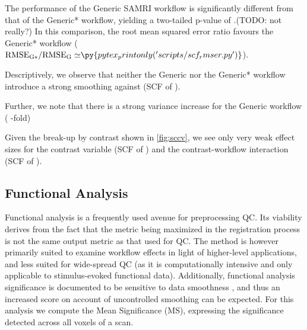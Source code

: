The performance of the Generic SAMRI workflow is significantly different from that of the Generic* workflow, yielding a two-tailed p-value of .(TODO: not really?)
In this comparison, the root mean squared error ratio favours the Generic* workflow ($\mathrm{RMSE_{G*}/RMSE_{G}\simeq} \py{pytex_printonly('scripts/scf_rmser.py')}$).

Descriptively, we observe that neither the Generic nor the Generic* workflow introduce a strong smoothing
against
(SCF of ).

Further, we note that there is a strong variance increase for the Generic workflow
(
-fold)

Given the break-up by contrast shown in \cref{fig:sccv}, we see only very weak effect sizes for the contrast variable
(SCF of )
and the contrast-workflow interaction
(SCF of ).

\subsection{Functional Analysis}

Functional analysis is a frequently used avenue for preprocessing QC.
Its viability derives from the fact that the metric being maximized in the registration process is not the same output metric as that used for QC.
The method is however primarily suited to examine workflow effects in light of higher-level applications, and less suited for wide-spread QC (as it is computationally intensive and only applicable to stimulus-evoked functional data).
Additionally, functional analysis significance is documented to be sensitive to data smoothness \cite{Molloy2014}, and thus an increased score on account of uncontrolled smoothing can be expected.
For this analysis we compute the Mean Significance (MS), expressing the significance detected across all voxels of a scan.

